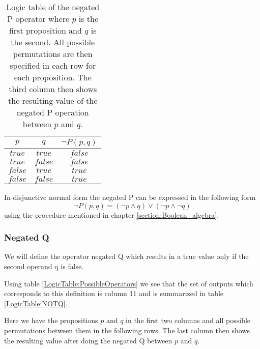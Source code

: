         \begin{table}[h!]
            \centering
            \begin{tabular}{|c|c|c|}
            	\hline
            	  $p$   &   $q$   & $\neg P(p, q)$ \\ \hline
            	$true$  & $true$  &    $false$     \\ \hline
            	$true$  & $false$ &    $false$     \\ \hline
            	$false$ & $true$  &     $true$     \\ \hline
            	$false$ & $false$ &     $true$     \\ \hline
            \end{tabular}
            \caption{Logic table of the negated P operator where $p$ is the first proposition and $q$ is the second. All possible permutations are then specified in each row for each proposition. The third column then shows the resulting value of the negated P operation between $p$ and $q$.}
            \label{LogicTable:NOTP}
        \end{table}
        
        In disjunctive normal form the negated P can be expressed in the following form
        \begin{equation}
            \neg P(p, q) = (\neg p \wedge  q) \vee (\neg p \wedge \neg q)
        \end{equation}
        using the procedure mentioned in chapter \ref{section:Boolean_algebra}.
        
    \subsubsection{Negated Q}
        We will define the operator negated Q which results in a true value only if the second operand q is false.
        
        Using table \ref{LogicTable:PossibleOperators} we see that the set of outputs which corresponds to this definition is column 11 and is summarized in table \ref{LogicTable:NOTQ}.
        
        Here we have the propositions $p$ and $q$ in the first two columns and all possible permutations between them in the following rows. The last column then shows the resulting value after doing the negated Q between $p$ and $q$.
        
